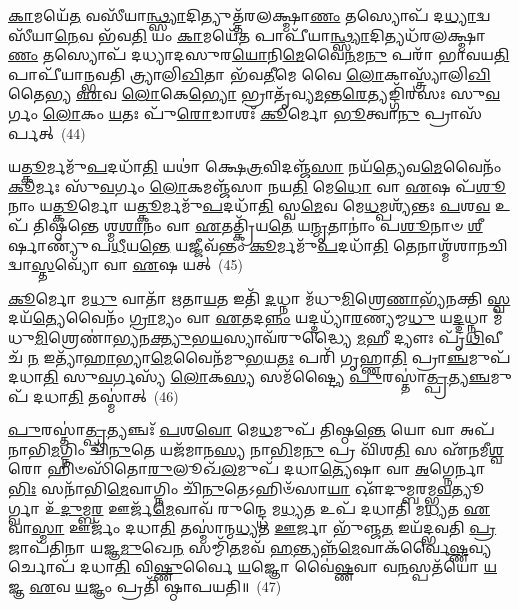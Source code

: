 \-\ul{𑌕𑌾}\-𑌮𑌯𑍇᳴\-\ul{𑌤} 𑌵𑌸𑍀᳴𑌯𑌾\-\ul{𑌨𑍍𑌥𑍍𑌸𑍍𑌯𑌾}\-𑌦𑌿𑌤𑍍𑌯𑍁𑌤𑍍𑌤᳴𑌰𑌲𑌕𑍍𑌷𑍍𑌮𑌾\-\ul{𑌣𑌂} 𑌤𑌸𑍍𑌯𑍋𑌪᳴ 𑌦\-\ul{𑌧𑍍𑌯𑌾}\-𑌦𑍍𑌵𑌸𑍀᳴𑌯𑌾\-\ul{𑌨𑍇}\-𑌵 𑌭᳴𑌵\-\ul{𑌤𑌿} 𑌯𑌂 \ul{𑌕𑌾}\-𑌮𑌯𑍇᳴\-\ul{𑌤} 𑌪𑌾𑌪𑍀᳴𑌯𑌾\-\ul{𑌨𑍍𑌥𑍍𑌸𑍍𑌯𑌾}\-𑌦𑌿𑌤𑍍𑌯𑌧᳴𑌰\-𑌲𑌕𑍍𑌷𑍍𑌮𑌾\-\ul{𑌣𑌂} 𑌤𑌸𑍍𑌯𑍋𑌪᳴ 𑌦𑌧𑍍𑌯𑌾𑌦𑌸𑍁𑌰\-\ul{𑌯𑍋}\-𑌨𑌿\-\ul{𑌮𑍇}\-𑌵𑍈\-\ul{𑌨}\-𑌮\-\ul{𑌨𑍁} 𑌪𑌰𑌾᳴ 𑌭𑌾𑌵𑌯\-\ul{𑌤𑌿} 𑌪𑌾𑌪𑍀᳴𑌯𑌾𑌨𑍍𑌭𑌵𑌤𑌿 𑌤𑍍𑌰𑍍𑌯𑌾𑌲𑌿\-\ul{𑌖𑌿}\-𑌤𑌾 𑌭᳴𑌵\-\ul{𑌤𑍀}\-𑌮𑍇 𑌵𑍈 \ul{𑌲𑍋}\-𑌕𑌾\-𑌸𑍍𑌤𑍍𑌰𑍍𑌯𑌾᳴𑌲𑌿\-\ul{𑌖𑌿}\-𑌤𑍈𑌭𑍍𑌯 \ul{𑌏}\-𑌵 \ul{𑌲𑍋}\-𑌕𑍇\-\ul{𑌭𑍍𑌯𑍋} 𑌭𑍍𑌰𑌾𑌤𑍃᳴𑌵𑍍𑌯\-\ul{𑌮}\-𑌨𑍍𑌤\-\ul{𑌰𑍇}\-𑌤𑍍𑌯𑌙𑍍𑌗𑌿᳴𑌰𑌸𑌃 𑌸𑍁\-\ul{𑌵}\-𑌰𑍍𑌗𑌂 \ul{𑌲𑍋}\-𑌕𑌂 \ul{𑌯}\-𑌤𑌃 𑌪𑍁᳴\-\ul{𑌰𑍋}\-𑌡𑌾𑌶𑌃᳴ \ul{𑌕𑍂}\-𑌰𑍍𑌮𑍋 \ul{𑌭𑍂}\-𑌤𑍍𑌵𑌾\-\ul{𑌨𑍁} 𑌪𑍍𑌰𑌾𑌸᳴𑌰𑍍𑌪𑌤𑍍~(44)

𑌯\-\ul{𑌤𑍍𑌕𑍂}\-𑌰𑍍𑌮𑌮𑍁᳴\-\ul{𑌪}\-𑌦𑌧𑌾᳴\-\ul{𑌤𑌿} 𑌯𑌥𑌾॑ 𑌕𑍍𑌷𑍇\-\ul{𑌤𑍍𑌰}\-𑌵𑌿𑌦𑌞𑍍𑌜᳴\-\ul{𑌸𑌾} 𑌨𑌯᳴\-\ul{𑌤𑍍𑌯𑍇}\-𑌵\-\ul{𑌮𑍇}\-𑌵𑍈𑌨𑌂᳴ \ul{𑌕𑍂}\-𑌰𑍍𑌮𑌃 𑌸𑍁᳴\-\ul{𑌵}\-𑌰𑍍𑌗𑌂 \ul{𑌲𑍋}\-𑌕𑌮𑌞𑍍𑌜᳴𑌸𑌾 𑌨𑌯\-\ul{𑌤𑌿} 𑌮𑍇\-\ul{𑌧𑍋} 𑌵𑌾 \ul{𑌏}\-𑌷 𑌪᳴\-\ul{𑌶𑍂}\-𑌨𑌾𑌂 𑌯\-\ul{𑌤𑍍𑌕𑍂}\-𑌰𑍍𑌮𑍋 𑌯\-\ul{𑌤𑍍𑌕𑍂}\-𑌰𑍍𑌮𑌮𑍁᳴\-\ul{𑌪}\-𑌦𑌧𑌾᳴\-\ul{𑌤𑌿} 𑌸𑍍𑌵\-\ul{𑌮𑍇}\-𑌵 𑌮𑍇\-\ul{𑌧}\-𑌮𑍍𑌪𑌶𑍍𑌯᳴𑌨𑍍𑌤𑌃 \ul{𑌪}\-𑌶\-\ul{𑌵} 𑌉𑌪᳴ 𑌤𑌿𑌷𑍍𑌠𑌨𑍍𑌤𑍇 𑌶𑍍𑌮\-\ul{𑌶𑌾}\-𑌨𑌂 𑌵𑌾 \ul{𑌏}\-𑌤𑌤𑍍𑌕𑍍𑌰𑌿᳴𑌯\-\ul{𑌤𑍇} 𑌯\-\ul{𑌨𑍍𑌮𑍃}\-𑌤𑌾𑌨𑌾𑌂॑ 𑌪\-\ul{𑌶𑍂}\-𑌨𑌾𑍞 \ul{𑌶𑍀}\-𑌰𑍍\mbox{}𑌷𑌾𑌣𑍍𑌯𑍁᳴𑌪\-\ul{𑌧𑍀}\-𑌯\-\ul{𑌨𑍍𑌤𑍇} 𑌯𑌜𑍍𑌜𑍀𑌵᳴𑌨𑍍𑌤𑌂 \ul{𑌕𑍂}\-𑌰𑍍𑌮𑌮𑍁᳴\-\ul{𑌪}\-𑌦𑌧𑌾᳴\-\ul{𑌤𑌿} 𑌤𑍇𑌨𑌾𑌶𑍍𑌮᳴𑌶𑌾𑌨𑌚𑌿𑌦𑍍𑌵𑌾\-\ul{𑌸𑍍𑌤}\-𑌵𑍍𑌯𑍋᳴ 𑌵𑌾 \ul{𑌏}\-𑌷 𑌯𑌤𑍍~(45)

\-\ul{𑌕𑍂}\-𑌰𑍍𑌮𑍋 𑌮\-\ul{𑌧𑍁} 𑌵𑌾𑌤𑌾᳴ 𑌋𑌤𑌾\-\ul{𑌯}\-𑌤 𑌇𑌤𑌿᳴ \ul{𑌦}\-𑌧𑍍𑌨𑌾 𑌮᳴𑌧𑍁\-\ul{𑌮𑌿}\-𑌶𑍍𑌰𑍇\-\ul{𑌣𑌾}\-𑌭𑍍𑌯᳴𑌨𑌕𑍍𑌤𑌿 \ul{𑌸𑍍𑌵}\-𑌦𑌯᳴\-\ul{𑌤𑍍𑌯𑍇}\-𑌵𑍈𑌨𑌂᳴ \ul{𑌗𑍍𑌰𑌾}\-𑌮𑍍𑌯𑌂 𑌵𑌾 \ul{𑌏}\-𑌤𑌦\-\ul{𑌨𑍍𑌨𑌂} 𑌯𑌦𑍍𑌦𑌧𑍍𑌯𑌾᳴\-\ul{𑌰}\-𑌣𑍍𑌯𑌮𑍍𑌮\-\ul{𑌧𑍁} 𑌯\-\ul{𑌦𑍍𑌦}\-𑌧𑍍𑌨𑌾 𑌮᳴𑌧𑍁\-\ul{𑌮𑌿}\-𑌶𑍍𑌰𑍇𑌣𑌾॑\-\ul{𑌭𑍍𑌯}\-𑌨\-\ul{𑌕𑍍𑌤𑍍𑌯𑍁}\-𑌭\-\ul{𑌯}\-𑌸𑍍𑌯𑌾𑌵᳴𑌰𑍁𑌦𑍍𑌧𑍍𑌯𑍈 \ul{𑌮}\-𑌹𑍀 𑌦𑍍𑌯𑍗𑌃 𑌪𑍃᳴\-\ul{𑌥𑌿}\-𑌵𑍀 𑌚᳴ \ul{𑌨} 𑌇𑌤𑍍𑌯𑌾᳴\-\ul{𑌹𑌾}\-𑌭𑍍𑌯𑌾\-\ul{𑌮𑍇}\-𑌵𑍈𑌨᳴𑌮𑍁\-\ul{𑌭}\-𑌯\-\ul{𑌤𑌃} 𑌪𑌰𑌿᳴ 𑌗𑍃𑌹𑍍𑌣𑌾\-\ul{𑌤𑌿} 𑌪𑍍𑌰𑌾\-\ul{𑌞𑍍𑌚}\-𑌮𑍁𑌪᳴ 𑌦𑌧𑌾\-\ul{𑌤𑌿} 𑌸𑍁\-\ul{𑌵}\-𑌰𑍍𑌗𑌸𑍍𑌯᳴ \ul{𑌲𑍋}\-𑌕\-\ul{𑌸𑍍𑌯} 𑌸𑌮᳴𑌷𑍍𑌟𑍍𑌯𑍈 \ul{𑌪𑍁}\-𑌰𑌸𑍍𑌤𑌾॑\-\ul{𑌤𑍍𑌪𑍍𑌰}\-𑌤𑍍𑌯\-\ul{𑌞𑍍𑌚}\-𑌮𑍁𑌪᳴ 𑌦𑌧𑌾\-\ul{𑌤𑌿} 𑌤𑌸𑍍𑌮𑌾॑𑌤𑍍~(46)

\-\ul{𑌪𑍁}\-𑌰𑌸𑍍𑌤𑌾॑\-\ul{𑌤𑍍𑌪𑍍𑌰}\-𑌤𑍍𑌯𑌞𑍍𑌚𑌃᳴ \ul{𑌪}\-𑌶\-\ul{𑌵𑍋} 𑌮𑍇\-\ul{𑌧}\-𑌮𑍁𑌪᳴ 𑌤𑌿𑌷𑍍𑌠\-\ul{𑌨𑍍𑌤𑍇} 𑌯𑍋 𑌵𑌾 𑌅𑌪᳴𑌨𑌾𑌭𑌿\-\ul{𑌮}\-𑌗𑍍𑌨𑌿𑌂 𑌚𑌿᳴\-\ul{𑌨𑍁}\-𑌤𑍇 𑌯𑌜᳴𑌮𑌾𑌨\-\ul{𑌸𑍍𑌯} 𑌨𑌾\-\ul{𑌭𑌿}\-𑌮\-\ul{𑌨𑍁} 𑌪𑍍𑌰 𑌵𑌿᳴𑌶\-\ul{𑌤𑌿} 𑌸 𑌏᳴𑌨𑌮𑍀\-\ul{𑌶𑍍𑌵}\-𑌰𑍋 𑌹𑌿𑍞𑌸𑌿᳴𑌤𑍋\-\ul{𑌰𑍁}\-𑌲𑍂𑌖᳴\-\ul{𑌲}\-𑌮𑍁𑌪᳴ 𑌦𑌧𑌾\-\ul{𑌤𑍍𑌯𑍇}\-𑌷𑌾 𑌵𑌾 \ul{𑌅}\-𑌗𑍍𑌨𑍇𑌰𑍍𑌨𑌾\-\ul{𑌭𑌿𑌃} 𑌸𑌨𑌾᳴𑌭𑌿\-\ul{𑌮𑍇}\-𑌵𑌾𑌗𑍍𑌨𑌿𑌂 𑌚𑌿᳴\-\ul{𑌨𑍁}\-𑌤𑍇\-𑌽𑌹𑌿𑍞᳴𑌸𑌾\-\ul{𑌯𑌾} 𑌔᳴𑌦𑍁𑌮𑍍𑌬𑌰𑌮𑍍𑌭\-\ul{𑌵}\-𑌤𑍍𑌯𑍂𑌰𑍍𑌗𑍍𑌵𑌾 𑌉᳴\-\ul{𑌦𑍁}\-𑌮𑍍𑌬\-\ul{𑌰} 𑌊𑌰𑍍𑌜᳴\-\ul{𑌮𑍇}\-𑌵𑌾𑌵᳴ 𑌰𑍁𑌨𑍍𑌦𑍍𑌧𑍇 𑌮\-\ul{𑌧𑍍𑌯}\-𑌤 𑌉𑌪᳴ 𑌦𑌧𑌾𑌤𑌿 𑌮\-\ul{𑌧𑍍𑌯}\-𑌤 \ul{𑌏}\-𑌵𑌾\-\ul{𑌸𑍍𑌮𑌾} 𑌊𑌰𑍍𑌜𑌂᳴ 𑌦𑌧𑌾\-\ul{𑌤𑌿} 𑌤𑌸𑍍𑌮𑌾॑𑌨𑍍𑌮\-\ul{𑌧𑍍𑌯}\-𑌤 \ul{𑌊}\-𑌰𑍍𑌜𑌾 𑌭𑍁᳴𑌞𑍍𑌜\-\ul{𑌤} 𑌇𑌯᳴𑌦𑍍𑌭𑌵𑌤𑌿 \ul{𑌪𑍍𑌰}\-𑌜𑌾𑌪᳴𑌤𑌿𑌨𑌾 𑌯𑌜𑍍𑌞\-\ul{𑌮𑍁}\-𑌖𑍇\-\ul{𑌨} 𑌸𑌮𑍍𑌮𑌿᳴\-\ul{𑌤}\-𑌮𑌵᳴ \ul{𑌹}\-𑌨𑍍𑌤𑍍𑌯𑌨𑍍𑌨᳴\-\ul{𑌮𑍇}\-𑌵𑌾𑌕᳴𑌰𑍍𑌵𑍈\-\ul{𑌷𑍍𑌣}\-𑌵𑍍𑌯𑌰𑍍𑌚𑍋𑌪᳴ 𑌦𑌧𑌾\-\ul{𑌤𑌿} 𑌵𑌿\-\ul{𑌷𑍍𑌣𑍁}\-𑌰𑍍𑌵𑍈 \ul{𑌯}\-𑌜𑍍𑌞𑍋 𑌵𑍈॑\-\ul{𑌷𑍍𑌣}\-𑌵𑌾 𑌵\-\ul{𑌨}\-𑌸𑍍𑌪𑌤᳴𑌯𑍋 \ul{𑌯}\-𑌜𑍍𑌞 \ul{𑌏}\-𑌵 \ul{𑌯}\-𑌜𑍍𑌞𑌂 𑌪𑍍𑌰𑌤𑌿᳴ 𑌷𑍍𑌠𑌾𑌪𑌯𑌤𑌿॥~(47)

